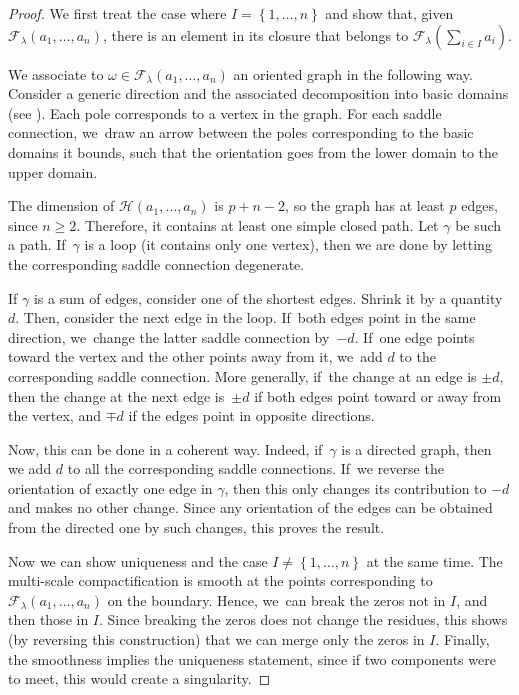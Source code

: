 \begin{proof}
We first treat the case where $I=\left\{1,\dots,n\right\}$ and show that, given $\mathcal{F}_{\lambda}(a_{1},\dots,a_{n})$, there is an element in its closure that belongs to $\mathcal{F}_{\lambda}(\sum_{i\in I} a_{i})$.

We associate to $\omega\in \mathcal{F}_{\lambda}(a_{1},\dots,a_{n})$ an oriented graph in the following way. Consider a generic direction and the associated decomposition into basic domains (see \cite[\S 3.3]{Bo}). Each pole corresponds to a vertex in the graph. For each saddle connection, we~draw an arrow between the poles corresponding to the basic domains it bounds, such that the orientation goes from the lower domain to the upper domain.

The dimension of $\mathcal{H}(a_{1},\dots,a_{n})$ is $p+n-2$, so the graph has at least $p$ edges, since $n\geq2$. Therefore, it contains at least one simple closed path. Let $\gamma$ be such a path. If~$\gamma$ is a loop (\ie it contains only one vertex), then we are done by letting the corresponding saddle connection degenerate.

If $\gamma$ is a sum of edges, consider one of the shortest edges. Shrink it by a quantity $d$. Then, consider the next edge in the loop. If~both edges point in the same direction, we~change the latter saddle connection by~$-d$. If~one edge points toward the vertex and the other points away from it, we~add $d$ to the corresponding saddle connection. More generally, if~the change at an edge is $\pm d$, then the change at the next edge is~$\pm d$ if both edges point toward or away from the vertex, and $\mp d$ if the edges point in opposite directions.

Now, this can be done in a coherent way. Indeed, if~$\gamma$ is a directed graph, then we add $d$ to all the corresponding saddle connections. If~we reverse the orientation of exactly one edge in $\gamma$, then this only changes its contribution to $-d$ and makes no other change. Since any orientation of the edges can be obtained from the directed one by such changes, this proves the result.

Now we can show uniqueness and the case $I \neq \left\{1,\dots,n\right\}$ at the same time. The multi-scale compactification is smooth at the points corresponding to $\mathcal{F}_{\lambda}(a_{1},\dots,a_{n})$ on the boundary. Hence, we~can break the zeros not in $I$, and then those in $I$. Since breaking the zeros does not change the residues, this shows (by reversing this construction) that we can merge only the zeros in $I$. Finally, the smoothness implies the uniqueness statement, since if two components were to meet, this would create a singularity.
\end{proof}

